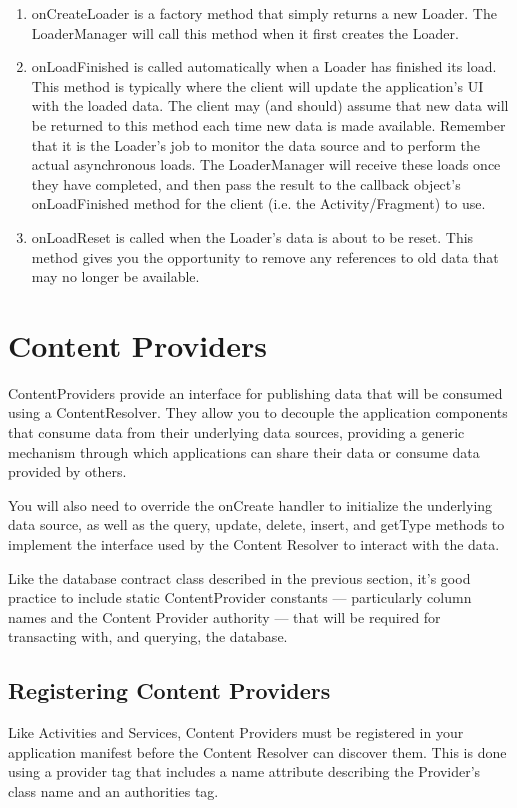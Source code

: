 \begin{enumerate}
	\item onCreateLoader is a factory method that simply returns a new Loader. The LoaderManager will call this method when it first creates the Loader.
	
	\item onLoadFinished is called automatically when a Loader has finished its load. This method is typically where the client will update the application’s UI with the loaded data. The client may (and should) assume that new data will be returned to this method each time new data is made available. Remember that it is the Loader’s job to monitor the data source and to perform the actual asynchronous loads. The LoaderManager will receive these loads once they have completed, and then pass the result to the callback object’s onLoadFinished method for the client (i.e. the Activity/Fragment) to use.
	
	\item onLoadReset is called when the Loader’s data is about to be reset. This method gives you the opportunity to remove any references to old data that may no longer be available.
\end{enumerate}

\section{Content Providers}
ContentProviders  provide an interface for publishing data that will be consumed using a ContentResolver. They allow you to decouple the application components that consume data from their underlying data sources, providing a generic mechanism through which applications can share their data or consume data provided by others.

You will also need to override the onCreate handler to initialize the underlying data source, as well as the query, update, delete, insert, and getType methods to implement the interface used by the Content Resolver to interact with the data.

\begin{framed}
	Like the database contract class described in the previous section, it’s good practice to include static ContentProvider constants — particularly column names and the Content Provider authority — that will be required for transacting with, and querying, the database.
\end{framed}

\subsection{Registering Content Providers}
Like Activities and Services, Content Providers must be registered in your application manifest before the Content Resolver can discover them. This is done using a provider tag that includes a name attribute describing the Provider’s class name and an authorities tag.

